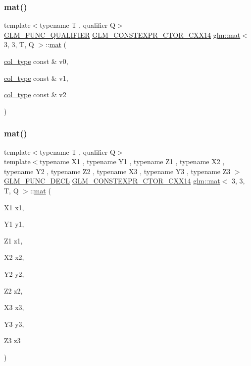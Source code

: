\subsubsection{\texorpdfstring{mat()}{mat()}\hspace{0.1cm}{\footnotesize\ttfamily [6/21]}}
{\footnotesize\ttfamily template$<$typename T , qualifier Q$>$ \\
\hyperlink{setup_8hpp_a33fdea6f91c5f834105f7415e2a64407}{G\+L\+M\+\_\+\+F\+U\+N\+C\+\_\+\+Q\+U\+A\+L\+I\+F\+I\+ER} \hyperlink{setup_8hpp_a0900f9145e68bf6061b6f5e7be3fa751}{G\+L\+M\+\_\+\+C\+O\+N\+S\+T\+E\+X\+P\+R\+\_\+\+C\+T\+O\+R\+\_\+\+C\+X\+X14} \hyperlink{structglm_1_1mat}{glm\+::mat}$<$ 3, 3, T, Q $>$\+::\hyperlink{structglm_1_1mat}{mat} (\begin{DoxyParamCaption}\item[{\hyperlink{structglm_1_1mat_3_013_00_013_00_01_t_00_01_q_01_4_a4d84bef3685131dbb0ac43cac0a3b147}{col\+\_\+type} const \&}]{v0,  }\item[{\hyperlink{structglm_1_1mat_3_013_00_013_00_01_t_00_01_q_01_4_a4d84bef3685131dbb0ac43cac0a3b147}{col\+\_\+type} const \&}]{v1,  }\item[{\hyperlink{structglm_1_1mat_3_013_00_013_00_01_t_00_01_q_01_4_a4d84bef3685131dbb0ac43cac0a3b147}{col\+\_\+type} const \&}]{v2 }\end{DoxyParamCaption})}

\mbox{\label{structglm_1_1mat_3_013_00_013_00_01_t_00_01_q_01_4_a36c7325f7b4164d6ed70aab38cf5828c}} 
\subsubsection{\texorpdfstring{mat()}{mat()}\hspace{0.1cm}{\footnotesize\ttfamily [7/21]}}
{\footnotesize\ttfamily template$<$typename T , qualifier Q$>$ \\
template$<$typename X1 , typename Y1 , typename Z1 , typename X2 , typename Y2 , typename Z2 , typename X3 , typename Y3 , typename Z3 $>$ \\
\hyperlink{setup_8hpp_ab2d052de21a70539923e9bcbf6e83a51}{G\+L\+M\+\_\+\+F\+U\+N\+C\+\_\+\+D\+E\+CL} \hyperlink{setup_8hpp_a0900f9145e68bf6061b6f5e7be3fa751}{G\+L\+M\+\_\+\+C\+O\+N\+S\+T\+E\+X\+P\+R\+\_\+\+C\+T\+O\+R\+\_\+\+C\+X\+X14} \hyperlink{structglm_1_1mat}{glm\+::mat}$<$ 3, 3, T, Q $>$\+::\hyperlink{structglm_1_1mat}{mat} (\begin{DoxyParamCaption}\item[{X1}]{x1,  }\item[{Y1}]{y1,  }\item[{Z1}]{z1,  }\item[{X2}]{x2,  }\item[{Y2}]{y2,  }\item[{Z2}]{z2,  }\item[{X3}]{x3,  }\item[{Y3}]{y3,  }\item[{Z3}]{z3 }\end{DoxyParamCaption})}

